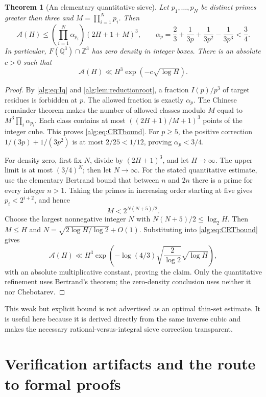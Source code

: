 \documentclass[11pt]{article}
\numberwithin{equation}{section}
\newtheorem{theorem}{Theorem}[section]
\theoremstyle{plain}
\theoremstyle{plain}
\theoremstyle{plain}
\theoremstyle{definition}
\theoremstyle{definition}
\theoremstyle{definition}
\theoremstyle{remark}
\newcommand{\Z}{\mathbb Z}\newcommand{\Q}{\mathbb Q}
\begin{document}
\begin{theorem}[An elementary quantitative sieve]\label{alg:thm:thinsieve}
Let $p_1,\ldots,p_N$ be distinct primes greater than three and
$M=\prod_{i=1}^N p_i$. Then
\begin{equation}\label{alg:eq:CRTbound}
 \mathcal A(H)\le
 \left(\prod_{i=1}^N\alpha_{p_i}\right)(2H+1+M)^3,
 \qquad
 \alpha_p=\frac23+\frac1{3p}+\frac1{3p^2}-\frac1{3p^3}<\frac34.
\end{equation}
In particular, $F(\Q^3)\cap\Z^3$ has zero density in integer boxes.
There is an absolute $c>0$ such that
\begin{equation}\label{alg:eq:quantzero}
 \mathcal A(H)\ll H^3\exp(-c\sqrt{\log H}).
\end{equation}
\end{theorem}
\begin{proof}
By \eqref{alg:eq:Iq} and \cref{alg:lem:reductionroot}, a fraction
$I(p)/p^3$ of target residues is forbidden at $p$. The allowed fraction
is exactly $\alpha_p$. The Chinese remainder theorem makes the number
of allowed classes modulo $M$ equal to $M^3\prod_i\alpha_{p_i}$.
Each class contains at most $((2H+1)/M+1)^3$ points of the integer cube.
This proves \eqref{alg:eq:CRTbound}.
For $p\ge5$, the positive correction
$1/(3p)+1/(3p^2)$ is at most $2/25<1/12$, proving
$\alpha_p<3/4$.

For density zero, first fix $N$, divide by $(2H+1)^3$, and let
$H\to\infty$. The upper limit is at most $(3/4)^N$; then let $N\to\infty$.
For the stated quantitative estimate, use the elementary Bertrand bound
that between $n$ and $2n$ there is a prime for every integer $n>1$.
Taking the primes in increasing order starting at five gives
$p_i<2^{i+2}$, and hence
\[
 M<2^{N(N+5)/2}.
\]
Choose the largest nonnegative integer $N$ with
$N(N+5)/2\le\log_2 H$. Then $M\le H$ and
$N=\sqrt{2\log H/\log2}+O(1)$. Substituting into
\eqref{alg:eq:CRTbound} gives
\[
 \mathcal A(H)\ll H^3
 \exp\left(-\log(4/3)\sqrt{\frac{2}{\log2}}\sqrt{\log H}\right),
\]
with an absolute multiplicative constant, proving the claim. Only the
quantitative refinement uses Bertrand's theorem; the zero-density
conclusion uses neither it nor Chebotarev.
\end{proof}
This weak but explicit bound is not advertised as an optimal thin-set
estimate. It is useful here because it is derived directly from the same
inverse cubic and makes the necessary rational-versus-integral sieve
correction transparent.

\section{Verification artifacts and the route to formal proofs}\label{alg:sec:verification}
\end{document}

